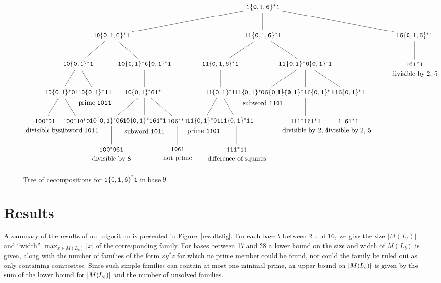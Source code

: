 \documentclass[12pt]{article}
\DeclarePairedDelimiter\abs{\lvert}{\rvert}
\theoremstyle{plain}
\theoremstyle{definition}
\theoremstyle{remark}
\newcommand{\0}{\mathtt{0}}
\newcommand{\1}{\mathtt{1}}
\newcommand{\2}{\mathtt{2}}
\newcommand{\3}{\mathtt{3}}
\newcommand{\4}{\mathtt{4}}
\newcommand{\5}{\mathtt{5}}
\newcommand{\6}{\mathtt{6}}
\newcommand{\7}{\mathtt{7}}
\newcommand{\8}{\mathtt{8}}
\newcommand{\9}{\mathtt{9}}
\begin{document}
\begin{sidewaysfigure}\begin{tiny}\[ \begin{tikzpicture}
\node{$\1\{\0,\1,\6\}^*\1$}[sibling distance=8cm]
	child{node{$\1\0\{\0,\1,\6\}^*\1$}[sibling distance=3.5cm]
		child{node{$\1\0\{\0,\1\}^*\1$}[sibling distance=1.75cm]
			child{node{$\1\0\{\0,\1\}^*\0\1$}
				child{node[label=below:{divisible by 2}]{$\1\0\0^*\0\1$}}
				child{node[label=below:{subword $\1\0\1\1$}]{$\1\0\0^*1\0^*\0\1$}}}
			child{node[label=below:{prime $\1\0\1\1$}]{$\1\0\{\0,\1\}^*\1\1$}}}
		child{node{$\1\0\{\0,\1\}^*\6\{\0,\1\}^*\1$}[sibling distance=1.75cm]
			child{node{$\1\0\{\0,\1\}^*\6\1^*\1$}
				child{node{$\1\0\{\0,\1\}^*\0\6\1^*\1$}
					child{node[label=below:{divisible by 8}]{$\1\0\0^*\0\6\1$}}}
				child{node[label=below:{subword $\1\0\1\1$}]{$\1\0\{\0,\1\}^*\1\6\1^*\1$}}
				child{node{$\1\0\6\1^*\1$}
					child{node[label=below:{not prime}]{$\1\0\6\1$}}}}}}
	child{node{$\1\1\{\0,\1,\6\}^*\1$}[sibling distance=4.5cm]
		child{node{$\1\1\{\0,\1,\6\}^*\1$}[sibling distance=1.75cm]
			child{node{$\1\1\{\0,\1\}^*\1$}
				child{node[label=below:{prime $\1\1\0\1$}]{$\1\1\{\0,\1\}^*\0\1$}}
				child{node{$\1\1\{\0,\1\}^*\1\1$}
					child{node[label=below:{difference of squares}]{$\1\1\1^*\1\1$}}}}}
		child{node{$\1\1\{\0,\1\}^*\6\{\0,\1\}^*\1$}[sibling distance=2.25cm]
			child{node[label=below:{subword $\1\1\0\1$}]{$\1\1\{\0,\1\}^*\0\6\{\0,\1\}^*\1$}}
			child{node{$\1\1\{\0,\1\}^*\1\6\{\0,\1\}^*\1$}
				child{node[label=below:{divisible by 2, 5}]{$\1\1\1^*\1\6\1^*\1$}}}
			child{node{$\1\1\6\{\0,\1\}^*\1$}
				child{node[label=below:{divisible by 2, 5}]{$\1\1\6\1^*\1$}}}}}
	child{node{$\1\6\{\0,\1,\6\}^*\1$}[sibling distance=5cm]
		child{node[label=below:{divisible by 2, 5}]{$\1\6\1^*\1$}[sibling distance=3cm]}};
\end{tikzpicture} \]\end{tiny}\caption{Tree of decompositions for $\1\{\0,\1,\6\}^*\1$ in base $9$.}\label{decomptree}\end{sidewaysfigure}

\section{Results}
A summary of the results of our algorithm is presented in 
Figure~\ref{resultsfig}.
For each base $b$ between 2 and 16,
we give the size $|M(L_b)|$ and ``width'' $\max_{x \in M(L_b)} |x|$ of
the corresponding family.
For bases between 17 and 28 a lower bound on the size and width of
$M(L_b)$ is given, along with the number of families of the form
$xy^*z$ for which no prime member could be found, nor could the family be
ruled out as only containing composites.  Since such simple families can contain at
most one minimal prime, an upper bound on $\abs{M(L_b)}$ is given by the
sum of the lower bound for $\abs{M(L_b)}$ and the number of unsolved families.
\end{document}
